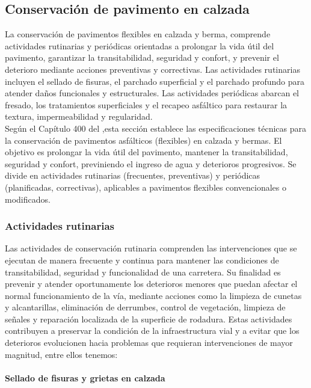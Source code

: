 \subsection{Conservación de pavimento en calzada}
La conservación de pavimentos flexibles en calzada y berma, comprende actividades rutinarias y periódicas orientadas a prolongar la vida útil del pavimento, garantizar la transitabilidad, seguridad y confort, y prevenir el deterioro mediante acciones preventivas y correctivas. Las actividades rutinarias incluyen el sellado de fisuras, el parchado superficial y el parchado profundo para atender daños funcionales y estructurales. Las actividades periódicas abarcan el fresado, los tratamientos superficiales y el recapeo asfáltico para restaurar la textura, impermeabilidad y regularidad.\\
Según el Capítulo 400 del \textcite{ManualCarreteras2018},esta sección establece las especificaciones técnicas para la conservación de pavimentos asfálticos (flexibles) en calzada y bermas. El objetivo es prolongar la vida útil del pavimento, mantener la transitabilidad, seguridad y confort, previniendo el ingreso de agua y deterioros progresivos. Se divide en actividades rutinarias (frecuentes, preventivas) y periódicas (planificadas, correctivas), aplicables a pavimentos flexibles convencionales o modificados. 

\subsubsection{Actividades rutinarias}
Las actividades de conservación rutinaria comprenden las intervenciones que se ejecutan de manera frecuente y continua para mantener las condiciones de transitabilidad, seguridad y funcionalidad de una carretera. Su finalidad es prevenir y atender oportunamente los deterioros menores que puedan afectar el normal funcionamiento de la vía, mediante acciones como la limpieza de cunetas y alcantarillas, eliminación de derrumbes, control de vegetación, limpieza de señales y reparación localizada de la superficie de rodadura. Estas actividades contribuyen a preservar la condición de la infraestructura vial y a evitar que los deterioros evolucionen hacia problemas que requieran intervenciones de mayor magnitud, entre ellos tenemos:

\setcounter{paragraph}{0}
\paragraph{Sellado de fisuras y grietas en calzada}

